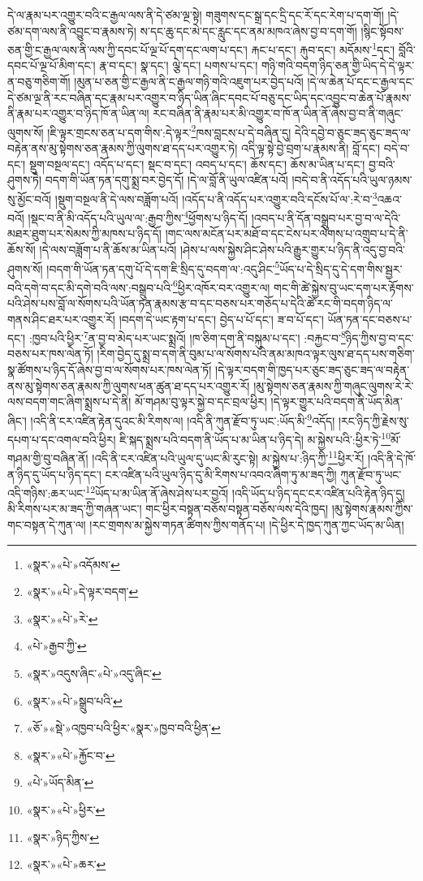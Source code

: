 དེ་ལ་རྣམ་པར་འགྱུར་བའི་ང་རྒྱལ་ལས་ནི་དེ་ཙམ་ལྔ་སྟེ། གཟུགས་དང་སྒྲ་དང་དྲི་དང་རོ་དང་རེག་པ་དག་གོ། །དེ་ཙམ་དག་ལས་ནི་འབྱུང་བ་རྣམས་ཏེ། ས་དང་ཆུ་དང་མེ་དང་རླུང་དང་ནམ་མཁའ་ཞེས་བྱ་བ་དག་གོ། །སྙིང་སྟོབས་ཅན་གྱི་ང་རྒྱལ་ལས་ནི་ལས་ཀྱི་དབང་པོ་ལྔ་པོ་དག་དང་ལག་པ་དང་། རྐང་པ་དང་། རྐུབ་དང་། མདོམས་\footnote{«སྣར་»«པེ་»འདོམས་}དང་། བློའི་དབང་པོ་ལྔ་པོ་མིག་དང་། རྣ་བ་དང་། སྣ་དང་། ལྕེ་དང་། པགས་པ་དང་། གཉི་གའི་བདག་ཉིད་ཅན་གྱི་ཡིད་དེ་དེ་ལྟར་ན་བཅུ་གཅིག་གོ། །མུན་པ་ཅན་གྱི་ང་རྒྱལ་ནི་ང་རྒྱལ་གཉི་གའི་འཇུག་པར་བྱེད་པའོ། །དེ་ལ་ཆེན་པོ་དང་ང་རྒྱལ་དང་དེ་ཙམ་ལྔ་ནི་རང་བཞིན་དང་རྣམ་པར་འགྱུར་བ་ཉིད་ཡིན་ཞིང་དབང་པོ་བཅུ་དང་ཡིད་དང་འབྱུང་བ་ཆེན་པོ་རྣམས་ནི་རྣམ་པར་འགྱུར་བ་ཉིད་ཁོ་ན་ཡིན་ལ། རང་བཞིན་ནི་རྣམ་པར་མི་འགྱུར་བ་ཁོ་ན་ཡིན་ནོ་ཞེས་བྱ་བ་ནི་གཞུང་ལུགས་སོ། །ཇི་ལྟར་གྲངས་ཅན་པ་དག་གིས་:དེ་ལྟར་\footnote{«སྣར་»«པེ་»དེ་ལྟར་བདག་}ཁས་བླངས་པ་དེ་བཞིན་དུ། དེའི་དབྱེ་བ་ཅུང་ཟད་ཅུང་ཟད་ལ་བརྟེན་ནས་མུ་སྟེགས་ཅན་རྣམས་ཀྱི་ལུགས་ཐ་དད་པར་འགྱུར་ཏེ། འདི་ལྟ་སྟེ་བྱེ་བྲག་པ་རྣམས་ནི། བློ་དང་། བདེ་བ་དང་། སྡུག་བསྔལ་དང་། འདོད་པ་དང་། སྡང་བ་དང་། འབད་པ་དང་། ཆོས་དང་། ཆོས་མ་ཡིན་པ་དང་། བྱ་བའི་ཤུགས་ཏེ། བདག་གི་ཡོན་ཏན་དགུ་སྨྲ་བར་བྱེད་དོ། །དེ་ལ་བློ་ནི་ཡུལ་འཛིན་པའོ། །བདེ་བ་ནི་འདོད་པའི་ཡུལ་ཉམས་སུ་མྱོང་བའོ། །སྡུག་བསྔལ་ནི་དེ་ལས་བཟློག་པའོ། །འདོད་པ་ནི་འདོད་པར་འགྱུར་བའི་དངོས་པོ་ལ་:རེ་བ་\footnote{«སྣར་»«པེ་»རེ་}འཆའ་བའོ། །སྡང་བ་ནི་མི་འདོད་པའི་ཡུལ་ལ་:རྒྱབ་ཀྱིས་\footnote{«པེ་»རྒྱབ་ཀྱི་}ཕྱོགས་པ་ཉིད་དོ། །འབད་པ་ནི་དོན་བསྒྲུབ་པར་བྱ་བ་ལ་དེའི་མཐར་ཐུག་པར་སེམས་ཀྱི་མཁས་པ་ཉིད་དོ། །གང་ལས་མངོན་པར་མཐོ་བ་དང་ངེས་པར་ལེགས་པ་འགྲུབ་པ་དེ་ནི་ཆོས་སོ། །དེ་ལས་བཟློག་པ་ནི་ཆོས་མ་ཡིན་པའོ། །ཤེས་པ་ལས་སྐྱེས་ཤིང་ཤེས་པའི་རྒྱུར་གྱུར་པ་ཉིད་ནི་འདུ་བྱ་བའི་ཤུགས་སོ། །བདག་གི་ཡོན་ཏན་དགུ་པོ་དེ་དག་ཇི་སྲིད་དུ་བདག་ལ་:འདུ་ཤིང་\footnote{«སྣར་»འདུས་ཞིང་«པེ་»འདུ་ཞིང་}ཡོད་པ་དེ་སྲིད་དུ་དེ་དག་གིས་སྦྱར་བའི་དགེ་བ་དང་མི་དགེ་བའི་ལས་:བསྒྲུབ་པའི་\footnote{«སྣར་»«པེ་»སྒྲུབ་པའི་}ཕྱིར་འཁོར་བར་འགྱུར་ལ། གང་གི་ཚེ་སྐྱེས་བུ་ཡང་དག་པར་རྟོགས་པའི་ཤེས་པས་བློ་ལ་སོགས་པའི་ཡོན་ཏན་རྣམས་རྩ་བ་དང་བཅས་པར་གཅོད་པ་དེའི་ཚེ་རང་གི་བདག་ཉིད་ལ་གནས་ཤིང་ཐར་པར་འགྱུར་རོ། །བདག་དེ་ཡང་རྟག་པ་དང་། བྱེད་པ་པོ་དང་། ཟ་བ་པོ་དང་། ཡོན་ཏན་དང་བཅས་པ་དང་། :ཁྱབ་པའི་ཕྱིར་\footnote{«ཅོ་»«སྡེ་»འཁྱབ་པའི་ཕྱིར་«སྣར་»ཁྱབ་བའི་ཕྱིན་}ན་བྱ་བ་མེད་པར་ཡང་སྨྲའོ། །ཁ་ཅིག་དག་ནི་བསྐུམ་པ་དང་། :བརྐྱང་བ་\footnote{«སྣར་»«པེ་»རྐྱོང་བ་}ཉིད་ཀྱིས་བྱ་བ་དང་བཅས་པར་ཁས་ལེན་ཏོ། །རིག་བྱེད་དུ་སྨྲ་བ་དག་ནི་བུམ་པ་ལ་སོགས་པའི་ནམ་མཁའ་ལྟར་ལུས་ཐ་དད་པས་གཅིག་སྣ་ཚོགས་པ་ཉིད་དོ་ཞེས་བྱ་བ་ལ་སོགས་པར་ཁས་ལེན་ཏོ། །དེ་ལྟར་བདག་གི་ཁྱད་པར་ཅུང་ཟད་ཅུང་ཟད་ལ་བརྟེན་ནས་མུ་སྟེགས་ཅན་རྣམས་ཀྱི་ལུགས་ཕན་ཚུན་ཐ་དད་པར་འགྱུར་རོ། །མུ་སྟེགས་ཅན་རྣམས་ཀྱི་གཞུང་ལུགས་རེ་རེ་ལས་བདག་གང་ཞིག་སྨྲས་པ་དེ་ནི། མོ་གཤམ་བུ་ལྟར་སྐྱེ་བ་དང་བྲལ་ཕྱིར། །དེ་ལྟར་གྱུར་པའི་བདག་ནི་ཡོད་མིན་ཞིང་། །འདི་ནི་ངར་འཛིན་རྟེན་དུའང་མི་རིགས་ལ། །འདི་ནི་ཀུན་རྫོབ་ཏུ་ཡང་:ཡོད་མི་\footnote{«པེ་»ཡོད་མིན་}འདོད། །རང་ཉིད་ཀྱི་རྗེས་སུ་དཔག་པ་དང་འགལ་བའི་ཕྱིར། ཇི་སྐད་སྨྲས་པའི་བདག་ནི་ཡོད་པ་མ་ཡིན་པ་ཉིད་དེ། མ་སྐྱེས་པའི་:ཕྱིར་ཏེ་\footnote{«སྣར་»«པེ་»ཕྱིར་}མོ་གཤམ་གྱི་བུ་བཞིན་ནོ། །འདི་ནི་ངར་འཛིན་པའི་ཡུལ་དུ་ཡང་མི་རུང་སྟེ། མ་སྐྱེས་པ་:ཉིད་ཀྱི་\footnote{«སྣར་»ཉིད་ཀྱིས་}ཕྱིར་རོ། །འདི་ནི་དེ་ཁོ་ན་ཉིད་དུ་ཡོད་པ་ཉིད་དང་། ངར་འཛིན་པའི་ཡུལ་ཉིད་དུ་མི་རིགས་པ་འབའ་ཞིག་ཏུ་མ་ཟད་ཀྱི། ཀུན་རྫོབ་ཏུ་ཡང་འདི་གཉིས་:ཆར་ཡང་\footnote{«སྣར་»«པེ་»ཆར་}ཡོད་པ་མ་ཡིན་ནོ་ཞེས་ཤེས་པར་བྱའོ། །འདི་ཡོད་པ་ཉིད་དང་ངར་འཛིན་པའི་རྟེན་ཉིད་དུ། མི་རིགས་པར་མ་ཟད་ཀྱི་གཞན་ཡང་། གང་ཕྱིར་བསྟན་བཅོས་བསྟན་བཅོས་ལས་དེའི་ཁྱད། །མུ་སྟེགས་རྣམས་ཀྱིས་གང་བསྟན་དེ་ཀུན་ལ། །རང་གྲགས་མ་སྐྱེས་གཏན་ཚིགས་ཀྱིས་གནོད་པ། །དེ་ཕྱིར་དེ་ཁྱད་ཀུན་ཀྱང་ཡོད་མ་ཡིན། 